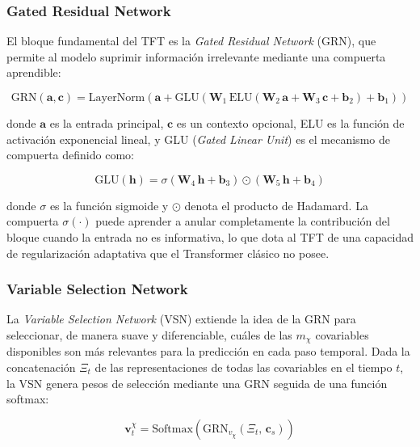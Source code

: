 \subsubsection{Gated Residual Network}

El bloque fundamental del TFT es la \textit{Gated Residual Network} (GRN), que permite al modelo suprimir información irrelevante mediante una compuerta aprendible:

\begin{equation}
\text{GRN}(\mathbf{a}, \mathbf{c}) = \text{LayerNorm}\left(\mathbf{a} + \text{GLU}\left(\mathbf{W}_1 \, \text{ELU}(\mathbf{W}_2 \, \mathbf{a} + \mathbf{W}_3 \, \mathbf{c} + \mathbf{b}_2) + \mathbf{b}_1\right)\right)
\end{equation}

donde $\mathbf{a}$ es la entrada principal, $\mathbf{c}$ es un contexto opcional, ELU es la función de activación exponencial lineal, y GLU (\textit{Gated Linear Unit}) es el mecanismo de compuerta definido como:

\begin{equation}
\text{GLU}(\mathbf{h}) = \sigma(\mathbf{W}_4 \, \mathbf{h} + \mathbf{b}_3) \odot (\mathbf{W}_5 \, \mathbf{h} + \mathbf{b}_4)
\end{equation}

donde $\sigma$ es la función sigmoide y $\odot$ denota el producto de Hadamard. La compuerta $\sigma(\cdot)$ puede aprender a anular completamente la contribución del bloque cuando la entrada no es informativa, lo que dota al TFT de una capacidad de regularización adaptativa que el Transformer clásico no posee.

\subsubsection{Variable Selection Network}

La \textit{Variable Selection Network} (VSN) extiende la idea de la GRN para seleccionar, de manera suave y diferenciable, cuáles de las $m_\chi$ covariables disponibles son más relevantes para la predicción en cada paso temporal. Dada la concatenación $\Xi_t$ de las representaciones de todas las covariables en el tiempo $t$, la VSN genera pesos de selección mediante una GRN seguida de una función softmax:

\begin{equation}
\mathbf{v}_t^\chi = \text{Softmax}\left(\text{GRN}_{v_\chi}\left(\Xi_t, \, \mathbf{c}_s\right)\right)
\end{equation}
 
